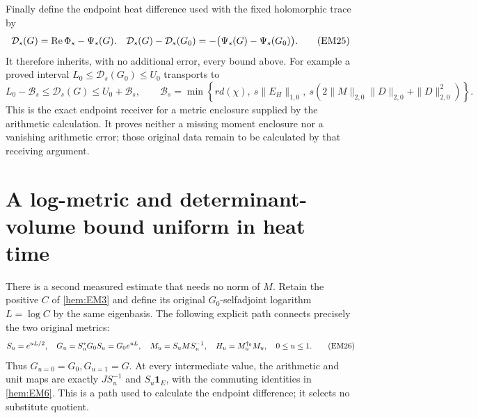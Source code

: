 \documentclass[11pt]{article}
\begin{document}
Finally define the endpoint heat difference used with the fixed
holomorphic trace by
\begin{equation}
 \mathcal D_s(G)=\operatorname{Re}\Phi_s-\Psi_s(G).
 \quad
 \mathcal D_s(G)-\mathcal D_s(G_0)
     =-\bigl(\Psi_s(G)-\Psi_s(G_0)\bigr).
 \tag{EM25}\label{hem:EM25}
\end{equation}
It therefore inherits, with no additional error, every bound above.
For example a proved interval
\(L_0\le\mathcal D_s(G_0)\le U_0\) transports to
\[
 L_0-\mathcal B_s\le\mathcal D_s(G)\le U_0+\mathcal B_s,
 \qquad
 \mathcal B_s=\min\!\left\{
 r d(\chi),\
 s\|E_H\|_{1,0},\
 s(2\|M\|_{2,0}\|D\|_{2,0}+\|D\|_{2,0}^2)
 \right\}.
\]
This is the exact endpoint receiver for a metric enclosure supplied by
the arithmetic calculation. It proves neither a missing moment enclosure
nor a vanishing arithmetic error; those original data remain to be
calculated by that receiving argument.

\section{A log-metric and determinant-volume bound uniform in heat time}

There is a second measured estimate that needs no norm of \(M\).
Retain the positive \(C\) of \eqref{hem:EM3} and define its original
\(G_0\)-selfadjoint logarithm \(L=\log C\) by the same eigenbasis.
The following explicit path connects precisely the two original metrics:
\begin{equation}
 S_u=e^{uL/2},\quad G_u=S_u^*G_0S_u=G_0e^{uL},\quad
 M_u=S_uMS_u^{-1},\quad H_u=M_u^{\dagger_0}M_u,\quad0\le u\le1.
 \tag{EM26}\label{hem:EM26}
\end{equation}
Thus \(G_{u=0}=G_0,G_{u=1}=G\). At every intermediate value, the
arithmetic and unit maps are exactly \(JS_u^{-1}\) and \(S_u\mathbf1_E\),
with the commuting identities in \eqref{hem:EM6}. This is a path used to
calculate the endpoint difference; it selects no substitute quotient.
\end{document}

